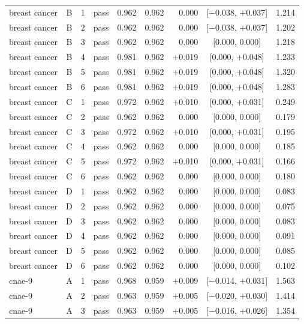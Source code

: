 {\begin{longtable}{lccl rrrcr}
\addlinespace[2pt]
breast cancer & B & 1 & pass & 0.962 & 0.962 & 0.000 & [$-$0.038, $+$0.037] & 1.214 \\
breast cancer & B & 2 & pass & 0.962 & 0.962 & 0.000 & [$-$0.038, $+$0.037] & 1.202 \\
breast cancer & B & 3 & pass & 0.962 & 0.962 & 0.000 & [0.000, 0.000] & 1.218 \\
breast cancer & B & 4 & pass & 0.981 & 0.962 & $+$0.019 & [0.000, $+$0.048] & 1.233 \\
breast cancer & B & 5 & pass & 0.981 & 0.962 & $+$0.019 & [0.000, $+$0.048] & 1.320 \\
breast cancer & B & 6 & pass & 0.981 & 0.962 & $+$0.019 & [0.000, $+$0.048] & 1.283 \\
\addlinespace[2pt]
breast cancer & C & 1 & pass & 0.972 & 0.962 & $+$0.010 & [0.000, $+$0.031] & 0.249 \\
breast cancer & C & 2 & pass & 0.962 & 0.962 & 0.000 & [0.000, 0.000] & 0.179 \\
breast cancer & C & 3 & pass & 0.972 & 0.962 & $+$0.010 & [0.000, $+$0.031] & 0.195 \\
breast cancer & C & 4 & pass & 0.962 & 0.962 & 0.000 & [0.000, 0.000] & 0.185 \\
breast cancer & C & 5 & pass & 0.972 & 0.962 & $+$0.010 & [0.000, $+$0.031] & 0.166 \\
breast cancer & C & 6 & pass & 0.962 & 0.962 & 0.000 & [0.000, 0.000] & 0.180 \\
\addlinespace[2pt]
breast cancer & D & 1 & pass & 0.962 & 0.962 & 0.000 & [0.000, 0.000] & 0.083 \\
breast cancer & D & 2 & pass & 0.962 & 0.962 & 0.000 & [0.000, 0.000] & 0.075 \\
breast cancer & D & 3 & pass & 0.962 & 0.962 & 0.000 & [0.000, 0.000] & 0.083 \\
breast cancer & D & 4 & pass & 0.962 & 0.962 & 0.000 & [0.000, 0.000] & 0.091 \\
breast cancer & D & 5 & pass & 0.962 & 0.962 & 0.000 & [0.000, 0.000] & 0.085 \\
breast cancer & D & 6 & pass & 0.962 & 0.962 & 0.000 & [0.000, 0.000] & 0.102 \\
\midrule
cnae-9 & A & 1 & pass & 0.968 & 0.959 & $+$0.009 & [$-$0.014, $+$0.031] & 1.563 \\
cnae-9 & A & 2 & pass & 0.963 & 0.959 & $+$0.005 & [$-$0.020, $+$0.030] & 1.414 \\
cnae-9 & A & 3 & pass & 0.963 & 0.959 & $+$0.005 & [$-$0.016, $+$0.026] & 1.354 \\

\end{longtable}}
